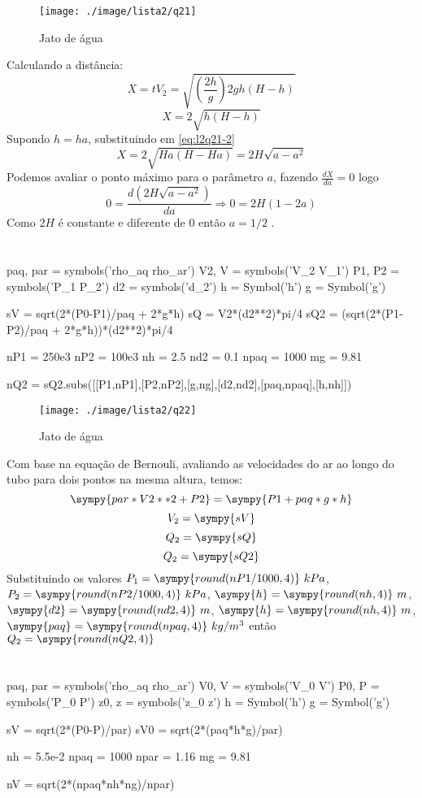 \documentclass[a4paper,twocolumn,11pt]{article}
\newcommand{\npy}[1]{\sympy{round(n#1,4)}}
\newcommand{\nnpy}[1]{\sympy{#1} = \sympy{round(n#1,4)}}
\begin{document}
\section{} %
\begin{figure}[H]
\centering
\label{fig:l2q21}
\texttt{[image: ./image/lista2/q21]}
\caption{Jato de água}
\end{figure}

Calculando a distância:
$$
X = t V_2 = \sqrt{\left(\frac{2h}{g}\right)2g h(H-h)}
$$
\begin{equation}\label{eq:l2q21-2}
X = 2\sqrt{h(H-h)}
\end{equation}
Supondo $h = h a$, substituindo em \eqref{eq:l2q21-2}
$$
X = 2\sqrt{H a(H-H a)} = 2H\sqrt{a - a^2}
$$
Podemos avaliar o ponto máximo para o parâmetro $a$, fazendo $\frac{d X}{da} = 0$ logo
$$
0 = \frac{d (2H\sqrt{a - a^2})}{da} \Rightarrow 0= 2H (1 - 2a) 
$$
Como $2H$ é constante e diferente de 0 então $a = 1/2$ .

\section{} %
\begin{sympycode}
paq, par = symbols('rho_aq rho_ar')
V2, V = symbols('V_2 V_1')
P1, P2 = symbols('P_1 P_2')
d2 = symbols('d_2')
h = Symbol('h')
g = Symbol('g')

sV = sqrt(2*(P0-P1)/paq + 2*g*h)
sQ = V2*(d2**2)*pi/4
sQ2 = (sqrt(2*(P1-P2)/paq + 2*g*h))*(d2**2)*pi/4

nP1 = 250e3
nP2 = 100e3
nh = 2.5
nd2 = 0.1
npaq = 1000
mg = 9.81

nQ2 = sQ2.subs([[P1,nP1],[P2,nP2],[g,ng],[d2,nd2],[paq,npaq],[h,nh]])

\end{sympycode}
\begin{figure}[H]
\centering
\label{fig:l2q22}
\texttt{[image: ./image/lista2/q22]}
\caption{Jato de água}
\end{figure}

Com base na equação de Bernouli, avaliando as velocidades do ar ao longo do tubo para dois pontos na mesma altura, temos:
$$
\sympy{par*V2**2 +P2} = \sympy{P1 + paq*g*h}
$$
$$
V_2 = \sympy{sV}
$$
$$
Q_2 = \sympy{sQ}
$$
$$
Q_2 = \sympy{sQ2}
$$
Substituindo os valores $P_1 = \npy{P1/1000}\ kPa$, $P_2 = \npy{P2/1000}\ kPa$, $\nnpy{h}\ m$, $\nnpy{d2}\ m$, $\nnpy{h}\ m$, $\nnpy{paq}\ kg/m^3$ então $Q_2 = \npy{Q2}$
\section{} %
\begin{sympycode}
paq, par = symbols('rho_aq rho_ar')
V0, V = symbols('V_0 V')
P0, P = symbols('P_0 P')
z0, z = symbols('z_0 z')
h = Symbol('h')
g = Symbol('g')

sV = sqrt(2*(P0-P)/par)
sV0 = sqrt(2*(paq*h*g)/par)

nh = 5.5e-2
npaq = 1000
npar = 1.16
mg = 9.81

nV = sqrt(2*(npaq*nh*ng)/npar)
\end{sympycode}
\end{document}
